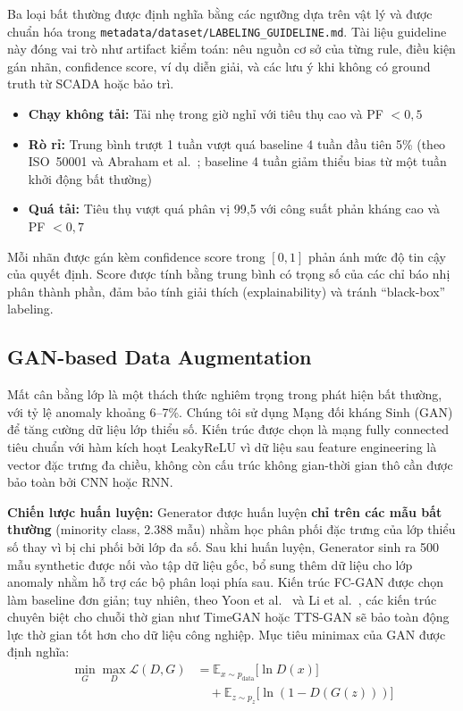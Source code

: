 \documentclass[conference]{IEEEtran}
\begin{document}
Ba loại bất thường được định nghĩa bằng các ngưỡng dựa trên vật lý và được chuẩn hóa trong
\texttt{metadata/dataset/LABELING\_GUIDELINE.md}. Tài liệu guideline này đóng vai trò như artifact kiểm toán:
nêu nguồn cơ sở của từng rule, điều kiện gán nhãn, confidence score, ví dụ diễn giải,
và các lưu ý khi không có ground truth từ SCADA hoặc bảo trì.
\begin{itemize}
\item \textbf{Chạy không tải:} Tải nhẹ trong giờ nghỉ với tiêu thụ cao và PF $< 0{,}5$
\item \textbf{Rò rỉ:} Trung bình trượt 1 tuần vượt quá baseline 4 tuần đầu tiên 5\%
(theo ISO~50001 và Abraham et al.~\cite{abraham2021iso};
baseline 4 tuần giảm thiểu bias từ một tuần khởi động bất thường)
\item \textbf{Quá tải:} Tiêu thụ vượt quá phân vị 99{,}5 với công suất phản kháng cao và PF $< 0{,}7$
\end{itemize}

Mỗi nhãn được gán kèm confidence score trong $[0,1]$ phản ánh mức độ tin cậy của quyết định.
Score được tính bằng trung bình có trọng số của các chỉ báo nhị phân thành phần,
đảm bảo tính giải thích (explainability) và tránh ``black-box'' labeling.

\subsection{GAN-based Data Augmentation}

Mất cân bằng lớp là một thách thức nghiêm trọng trong phát hiện bất thường,
với tỷ lệ anomaly khoảng 6--7\%.
Chúng tôi sử dụng Mạng đối kháng Sinh (GAN) để tăng cường dữ liệu lớp thiểu số.
Kiến trúc được chọn là mạng fully connected tiêu chuẩn với hàm kích hoạt LeakyReLU
vì dữ liệu sau feature engineering là vector đặc trưng đa chiều,
không còn cấu trúc không gian-thời gian thô cần được bảo toàn bởi CNN hoặc RNN.


\textbf{Chiến lược huấn luyện:} Generator được huấn luyện \textbf{chỉ trên các mẫu bất thường} (minority class, 2.388 mẫu)
nhằm học phân phối đặc trưng của lớp thiểu số thay vì bị chi phối bởi lớp đa số.
Sau khi huấn luyện, Generator sinh ra 500 mẫu synthetic được nối vào tập dữ liệu gốc,
bổ sung thêm dữ liệu cho lớp anomaly nhằm hỗ trợ các bộ phân loại phía sau.
Kiến trúc FC-GAN được chọn làm baseline đơn giản;
tuy nhiên, theo Yoon et al.~\cite{yoon2019} và Li et al.~\cite{li2022ttsgan},
các kiến trúc chuyên biệt cho chuỗi thờ gian như TimeGAN hoặc TTS-GAN
sẽ bảo toàn động lực thờ gian tốt hơn cho dữ liệu công nghiệp.
Mục tiêu minimax của GAN được định nghĩa:
\begin{equation}
\begin{aligned}
\min_G \max_D \mathcal{L}(D,G)
&= \mathbb{E}_{x\sim p_{\text{data}}}\big[\ln D(x)\big] \\
&\quad + \mathbb{E}_{z\sim p_z}\big[\ln(1-D(G(z)))\big]
\end{aligned}
\label{eq:gan}
\end{equation}
\end{document}
